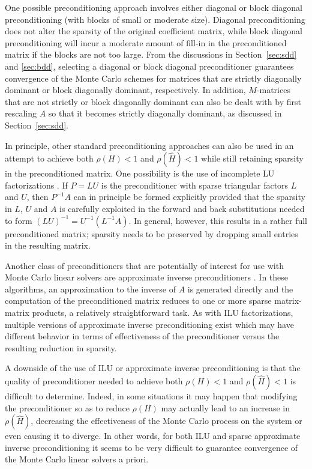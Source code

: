 \documentclass[final,leqno,onefignum,onetabnum]{siamltex1213}
\begin{document}
One possible preconditioning approach involves either diagonal or block
diagonal preconditioning (with blocks of small or moderate size). Diagonal
preconditioning does not alter the sparsity of the original coefficient matrix,
while block diagonal preconditioning will incur a moderate amount of
fill-in in the preconditioned matrix if the blocks are not too large.
From the discussions in Section~\ref{sec:sdd}
and \ref{sec:bdd}, selecting a diagonal or block diagonal preconditioner
guarantees convergence of the Monte Carlo schemes
for matrices that are strictly diagonally dominant
or block diagonally dominant, respectively. In addition, $M$-matrices
that are not strictly or block diagonally dominant can also be dealt with by
first rescaling $A$ so that it becomes strictly diagonally dominant, as
discussed in Section~\ref{sec:sdd}.

In principle,
other standard preconditioning approaches can also be used in an attempt
to achieve both $\rho(H)<1$ and $\rho(\hat{H})<1$ while still retaining
sparsity in the preconditioned matrix.  One possibility is the use of incomplete
LU factorizations \cite{Benzi2002,Saad}.  If $P=LU$ is the preconditioner
with sparse triangular factors $L$ and $U$, then $P^{-1}A$ can in principle
be formed explicitly
provided that the sparsity in $L$, $U$ and $A$
is carefully exploited in the forward and back substitutions
needed to form $(LU)^{-1}=U^{-1}(L^{-1}A)$. In general,
however, this results in a
rather full preconditioned matrix; sparsity needs to be preserved by dropping
small entries in
the resulting matrix.

Another class of preconditioners that are potentially of interest
for use with Monte Carlo
linear solvers are approximate inverse preconditioners
\cite{Benzi2002}.  In these algorithms, an approximation
to the inverse of $A$ is generated directly and the computation of the
preconditioned matrix reduces to one or more sparse matrix-matrix products,
a relatively
straightforward task.  As with ILU factorizations,
multiple versions of approximate inverse preconditioning exist which may
have different behavior in terms of effectiveness of the preconditioner
versus the resulting reduction in sparsity.

A downside of the use of ILU or approximate inverse preconditioning is that
the quality of preconditioner needed to achieve both $\rho(H)<1$
and $\rho(\hat{H})<1$ is difficult to determine.
Indeed, in some situations it may happen that
modifying the preconditioner so as to reduce $\rho(H)$ may actually lead to an
increase in $\rho(\hat{H})$, decreasing the effectiveness of the Monte
Carlo process on the system or even causing it to diverge.
In other words, for both ILU and sparse approximate inverse
preconditioning it seems to be very difficult to guarantee convergence
of the Monte Carlo linear solvers a priori.
\end{document}
